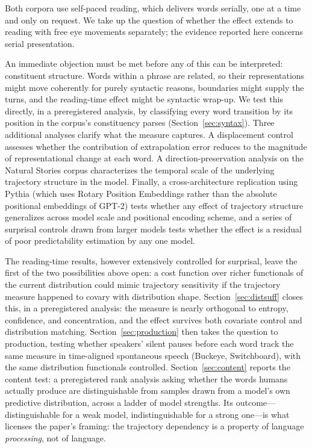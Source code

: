 \documentclass[12pt]{article}
\newcommand{\new}[1]{#1}   %
\begin{document}
\new{Both corpora use self-paced reading, which delivers words serially, one at a time and only on request. We take up the question of whether the effect extends to reading with free eye movements separately; the evidence reported here concerns serial presentation.}

\new{An immediate objection must be met before any of this can be interpreted: constituent structure. Words within a phrase are related, so their representations might move coherently for purely syntactic reasons, boundaries might supply the turns, and the reading-time effect might be syntactic wrap-up. We test this directly, in a preregistered analysis, by classifying every word transition by its position in the corpus's constituency parses (Section~\ref{sec:syntax}).} Three additional analyses clarify what the measure captures. A displacement control assesses whether the contribution of extrapolation error reduces to the magnitude of representational change at each word. A direction-preservation analysis on the Natural Stories corpus characterizes the temporal scale of the underlying trajectory structure in the model. Finally, \new{a cross-architecture replication using Pythia (which uses Rotary Position Embeddings rather than the absolute positional embeddings of GPT-2) tests whether any effect of trajectory structure generalizes across model scale and positional encoding scheme, and a series of surprisal controls drawn from larger models tests whether the effect is a residual of poor predictability estimation by any one model}.

\new{The reading-time results, however extensively controlled for surprisal, leave the first of the two possibilities above open: a cost function over richer functionals of the current distribution could mimic trajectory sensitivity if the trajectory measure happened to covary with distribution shape. Section~\ref{sec:distsuff} closes this, in a preregistered analysis: the measure is nearly orthogonal to entropy, confidence, and concentration, and the effect survives both covariate control and distribution matching. Section~\ref{sec:production} then takes the question to production, testing whether speakers' silent pauses before each word track the same measure in time-aligned spontaneous speech (Buckeye, Switchboard), with the same distribution functionals controlled. Section~\ref{sec:content} reports the content test: a preregistered rank analysis asking whether the words humans actually produce are distinguishable from samples drawn from a model's own predictive distribution, across a ladder of model strengths. Its outcome---distinguishable for a weak model, indistinguishable for a strong one---is what licenses the paper's framing: the trajectory dependency is a property of language \emph{processing}, not of language.}
\end{document}
